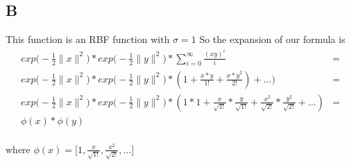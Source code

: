 \subsection{B}
This function is an RBF function with $\sigma = 1$
So the expansion of our formula is 
\begin{align*}
exp\Big( -\frac{1}{2} \lVert{x}\rVert^2\Big) * exp\Big( -\frac{1}{2} \lVert{y}\rVert^2\Big) * \sum_{i=0}^{\infty} \frac{(xy)^i}{i} &= \\
exp\Big( -\frac{1}{2} \lVert{x}\rVert^2\Big) * exp\Big( -\frac{1}{2} \lVert{y}\rVert^2\Big) * (1 + \frac{x*y}{1!} + \frac{{x*y}^2}{2!}) + \ldots) &= \\
exp\Big( -\frac{1}{2} \lVert{x}\rVert^2\Big) * exp\Big( -\frac{1}{2} \lVert{y}\rVert^2\Big) * (1*1 + \frac{x}{\sqrt{1!}}* \frac{y}{\sqrt{1!}} +  \frac{x^2}{\sqrt{2!}}* \frac{y^2}{\sqrt{2!}} + \ldots) &= \\
\phi(x) * \phi(y)\\
\end{align*}

where $\phi(x) = \Big[ 1,\frac{x}{\sqrt{1!}},\frac{x^2}{\sqrt{2!}}, \ldots \Big]$

